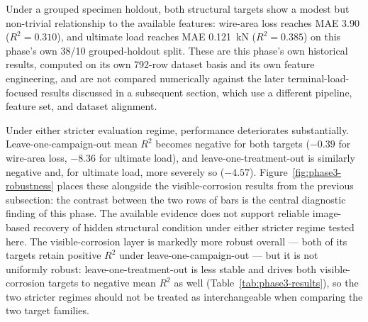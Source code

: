 Under a grouped specimen holdout, both structural targets show a modest but
non-trivial relationship to the available features: wire-area loss reaches
MAE 3.90 ($R^2=0.310$), and ultimate load reaches MAE 0.121~kN
($R^2=0.385$) on this phase's own 38/10 grouped-holdout split. These are
this phase's own historical results, computed on its own 792-row dataset
basis and its own feature engineering, and are not compared numerically
against the later terminal-load-focused results discussed in a subsequent
section, which use a different pipeline, feature set, and dataset
alignment.

Under either stricter evaluation regime, performance deteriorates
substantially. Leave-one-campaign-out mean $R^2$ becomes negative for both
targets ($-0.39$ for wire-area loss, $-8.36$ for ultimate load), and
leave-one-treatment-out is similarly negative and, for ultimate load, more
severely so ($-4.57$). Figure~\ref{fig:phase3-robustness} places these
alongside the visible-corrosion results from the previous subsection: the
contrast between the two rows of bars is the central diagnostic finding of
this phase. The available evidence does not support reliable image-based
recovery of hidden structural condition under either stricter regime tested
here. The visible-corrosion layer is markedly more robust overall — both of
its targets retain positive $R^2$ under leave-one-campaign-out — but it is
not uniformly robust: leave-one-treatment-out is less stable and drives
both visible-corrosion targets to negative mean $R^2$ as well
(Table~\ref{tab:phase3-results}), so the two stricter regimes should not be
treated as interchangeable when comparing the two target families.

